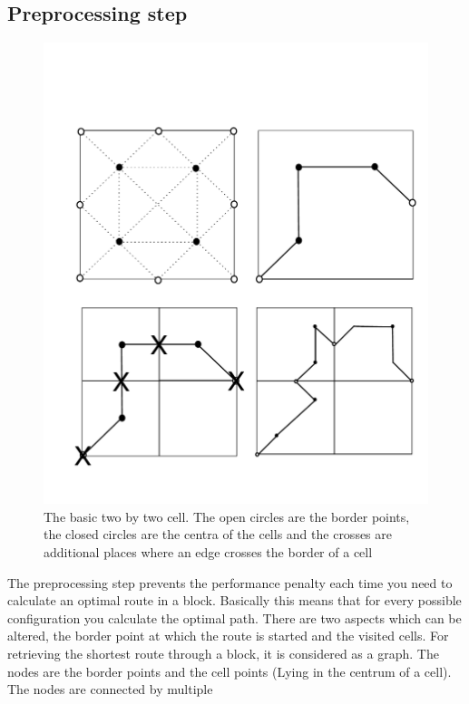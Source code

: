 \subsection{Preprocessing step}
\begin{figure}[t]
\begin{center}
\includegraphics[scale=0.25]{fig/renormalization.pdf}
\caption{The basic two by two cell. The open circles are the border points, the closed circles are the centra of the cells and the crosses are additional places where an edge crosses the border of a cell}
\label{fig:basic_cell}
\end{center}
\end{figure}
The preprocessing step prevents the performance penalty each time you need to calculate an optimal route in a block. Basically this means that for every possible configuration you calculate the optimal path. There are two aspects which can be altered, the border point at which the route is started and the visited cells.
\newline\newline\noindent
For retrieving the shortest route through a block, it is considered as a graph. The nodes are the border points and the cell points (Lying in the centrum of a cell). The nodes are connected by multiple
